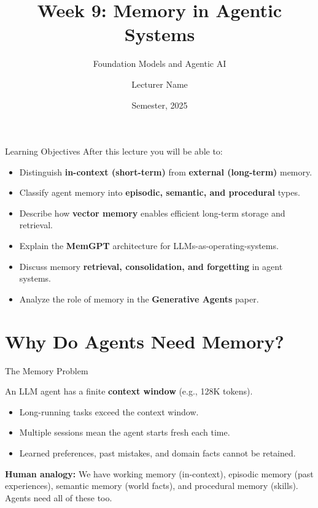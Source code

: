 \documentclass[aspectratio=169,10pt]{beamer}
\title{Week 9: Memory in Agentic Systems}
\subtitle{Foundation Models and Agentic AI}
\author{Lecturer Name}
\institute{Holon Institute of Technology (HIT)}
\date{Semester, 2025}
\begin{document}
\begin{frame}
  \titlepage
\end{frame}

\begin{frame}{Learning Objectives}
  After this lecture you will be able to:
  \begin{itemize}
    \item Distinguish \textbf{in-context (short-term)} from \textbf{external (long-term)} memory.
    \item Classify agent memory into \textbf{episodic, semantic, and procedural} types.
    \item Describe how \textbf{vector memory} enables efficient long-term storage and retrieval.
    \item Explain the \textbf{MemGPT} architecture for LLMs-as-operating-systems.
    \item Discuss memory \textbf{retrieval, consolidation, and forgetting} in agent systems.
    \item Analyze the role of memory in the \textbf{Generative Agents} paper.
  \end{itemize}
\end{frame}

\section{Why Do Agents Need Memory?}

\begin{frame}{The Memory Problem}
  \begin{tcolorbox}[alertbox, title=Core Challenge]
    An LLM agent has a finite \textbf{context window} (e.g., 128K tokens).
    \begin{itemize}
      \item Long-running tasks exceed the context window.
      \item Multiple sessions mean the agent starts fresh each time.
      \item Learned preferences, past mistakes, and domain facts cannot be retained.
    \end{itemize}
  \end{tcolorbox}
  \vspace{0.5em}
  \textbf{Human analogy:} We have working memory (in-context), episodic memory (past experiences), semantic memory (world facts), and procedural memory (skills). Agents need all of these too.
\end{frame}
\end{document}
